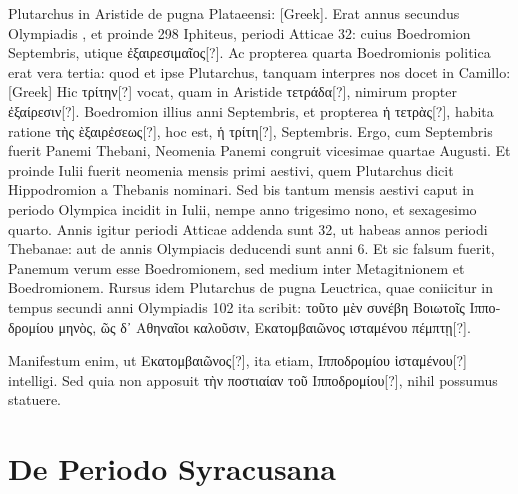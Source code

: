 Plutarchus
in Aristide de pugna Plataeensi: \textgreek{[Greek]}.
Erat annus secundus Olympiadis , et
proinde 298 Iphiteus, periodi Atticae 32: cuius Boedromion 
Septembris, utique \textgreek{ἐξαιρεσιμαῖος[?]}.
Ac propterea quarta Boedromionis
politica erat vera tertia: quod et ipse Plutarchus, tanquam interpres
nos docet in Camillo: \textgreek{[Greek]}
Hic \textgreek{τρίτην[?]}
vocat, quam in Aristide \textgreek{τετράδα[?]},
 nimirum propter \textgreek{ἐξαίρεσιν[?]}.
Boedromion illius anni  Septembris,
 et propterea \textgreek{ἡ τετρὰς[?]}, habita
ratione \textgreek{τὴς ὲξαιρἐσεως[?]}, hoc est, \textgreek{ἡ τρίτη[?]},
  Septembris.
Ergo, cum
 Septembris fuerit  Panemi Thebani, Neomenia Panemi
congruit vicesimae quartae Augusti.
Et proinde  Iulii fuerit
neomenia mensis primi aestivi, quem Plutarchus dicit Hippodromion
a Thebanis nominari.
Sed bis tantum mensis aestivi caput in
periodo Olympica incidit in  Iulii, nempe anno trigesimo nono,
et sexagesimo quarto.
Annis igitur periodi Atticae addenda sunt 32,
ut habeas annos periodi Thebanae: aut de annis Olympiacis deducendi
sunt anni 6.
Et sic falsum fuerit, Panemum verum esse Boedromionem,
sed medium inter Metagitnionem et Boedromionem.
Rursus idem Plutarchus de pugna Leuctrica, quae coniicitur in tempus
secundi anni Olympiadis 102 ita scribit: \textgreek{τοῦτο μὲν συνέβη Βοιωτοῖς
Ιπποδρομίου μηνὸς, ῶς δ᾽ Αθηναῖοι καλοῦσιν, Εκατομβαιῶνος ισταμένου
πέμπτῃ[?]}.

Manifestum enim, ut \textgreek{Εκατομβαιῶνος[?]},
 ita etiam, \textgreek{Ιπποδρομίου
ἱσταμένου[?]} intelligi.
Sed quia non apposuit \textgreek{τὴν ποστιαίαν τοῦ Ιπποδρομίου[?]}, nihil
possumus statuere.

\section{De Periodo Syracusana}

